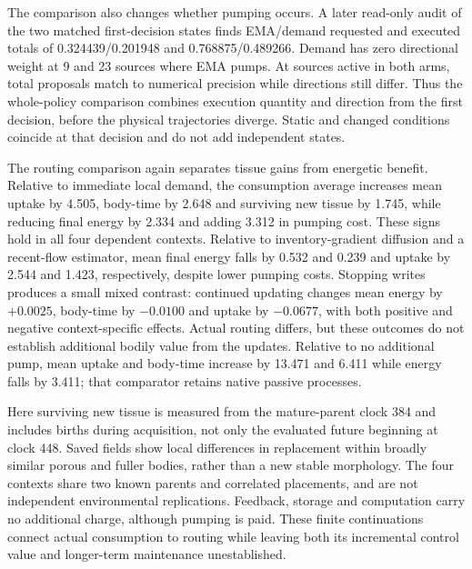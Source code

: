 The comparison also changes whether pumping occurs. A later read-only audit of the two matched first-decision states finds EMA/demand requested and executed totals of 0.324439/0.201948 and 0.768875/0.489266. Demand has zero directional weight at 9 and 23 sources where EMA pumps. At sources active in both arms, total proposals match to numerical precision while directions still differ. Thus the whole-policy comparison combines execution quantity and direction from the first decision, before the physical trajectories diverge. Static and changed conditions coincide at that decision and do not add independent states.

The routing comparison again separates tissue gains from energetic benefit. Relative to immediate local demand, the consumption average increases mean uptake by 4.505, body-time by 2.648 and surviving new tissue by 1.745, while reducing final energy by 2.334 and adding 3.312 in pumping cost. These signs hold in all four dependent contexts. Relative to inventory-gradient diffusion and a recent-flow estimator, mean final energy falls by 0.532 and 0.239 and uptake by 2.544 and 1.423, respectively, despite lower pumping costs. Stopping writes produces a small mixed contrast: continued updating changes mean energy by $+0.0025$, body-time by $-0.0100$ and uptake by $-0.0677$, with both positive and negative context-specific effects. Actual routing differs, but these outcomes do not establish additional bodily value from the updates. Relative to no additional pump, mean uptake and body-time increase by 13.471 and 6.411 while energy falls by 3.411; that comparator retains native passive processes.

Here surviving new tissue is measured from the mature-parent clock 384 and includes births during acquisition, not only the evaluated future beginning at clock 448. Saved fields show local differences in replacement within broadly similar porous and fuller bodies, rather than a new stable morphology. The four contexts share two known parents and correlated placements, and are not independent environmental replications. Feedback, storage and computation carry no additional charge, although pumping is paid. These finite continuations connect actual consumption to routing while leaving both its incremental control value and longer-term maintenance unestablished.


